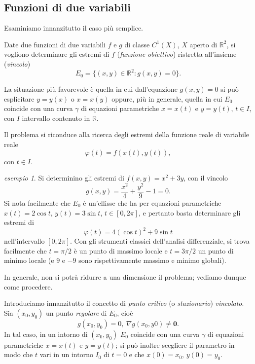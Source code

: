 \documentclass[a4paper]{book}
\numberwithin{equation}{section}
\renewcommand{\phi}{\varphi}
\theoremstyle{plain}
\theoremstyle{definition}
\theoremstyle{remark}
\renewcommand{\vec}{\boldsymbol}
\theoremstyle{example}
\newtheorem{exmp}{esempio}[section]
\begin{document}
\subsection{Funzioni di due variabili}
Esaminiamo innanzitutto il caso più semplice.

Date due funzioni di due variabili $f$ e $g$ di classe $C^1(X)$, $X$ aperto di $\mathbb{R}^2$, si vogliono determinare gli estremi di $f$ (\emph{funzione obiettivo}) ristretta all'insieme (\emph{vincolo})
	\begin{equation*}
	E_0 = \{ (x, y) \in \mathbb{R}^2 \colon g(x, y) = 0 \}.
	\end{equation*}

La situazione più favorevole è quella in cui dall'equazione $g(x, y) = 0$ si può esplicitare $y = y(x)$ o $x = x(y)$ oppure, più in generale, quella in cui $E_0$ coincide con una curva $\gamma$ di equazioni parametriche $x = x(t)$ e $y = y(t)$, $t \in I$, con $I$ intervallo contenuto in $\mathbb{R}$.

Il problema si riconduce alla ricerca degli estremi della funzione reale di variabile reale
	\begin{equation*}
	\phi (t) = f(x(t), y(t)),
	\end{equation*}
con $t \in I$.

\begin{exmp}
Si determinino gli estremi di $f(x, y) = x^2 + 3y$, con il vincolo
	\begin{equation*}
	g(x,y) = \frac{x^2}{4} + \frac{y^2}{9} - 1 = 0.
	\end{equation*}
Si nota facilmente che $E_0$ è un'ellisse che ha per equazioni parametriche $x(t) = 2 \cos{t}$, $y(t) = 3\sin{t}$, $t \in [0, 2 \pi]$, e pertanto basta determinare gli estremi di
	\begin{equation*}
	\phi(t) = 4(\cos{t})^2 + 9\sin{t}
	\end{equation*}
nell'intervallo $[0, 2\pi]$. Con gli strumenti classici dell'analisi differenziale, si trova facilmente che $t= \pi/2$ è un punto di massimo locale e $t = 3\pi/2$ un punto di minimo locale (e $9$ e $-9$ sono rispettivamente massimo e minimo globali).
\end{exmp}

In generale, non si potrà ridurre a una dimensione il problema; vediamo dunque come procedere.

Introduciamo innanzitutto il concetto di \emph{punto critico} (o \emph{stazionario}) \emph{vincolato}. Sia $(x_0, y_0)$ un punto \emph{regolare} di $E_0$, cioè
	\begin{equation*}
	g(x_0, y_0) = 0, \ \nabla g(x_0, y0) \ne \vec{0}.
	\end{equation*}
In tal caso, in un intorno di $(x_0, y_0)$ $E_0$ coincide con una curva $\gamma$ di equazioni parametriche $x = x(t)$ e $y = y(t)$; si può inoltre scegliere il parametro in modo che $t$ vari in un intorno $I_0$ di $t = 0$ e che $x(0) = x_0$, $y(0) = y_0$.
\end{document}
